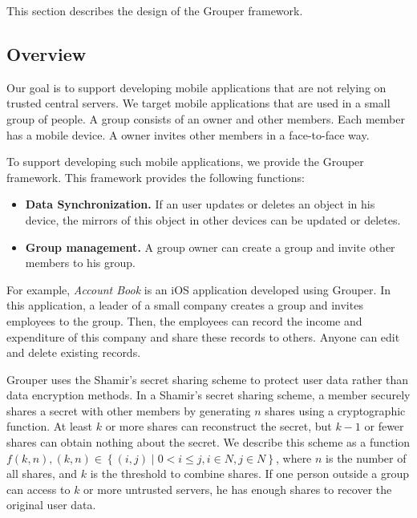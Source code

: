 \documentclass[twocolumn,10pt]{article}
\begin{document}
This section describes the design of the Grouper framework.

\subsection{Overview}

Our goal is to support developing mobile applications that are not relying on trusted central servers.
We target mobile applications that are used in a small group of people.
A group consists of an owner and other members.
Each member has a mobile device.
A owner invites other members in a face-to-face way.

To support developing such mobile applications, we provide the Grouper framework.
This framework provides the following functions:

\begin{itemize}
	\setlength{\itemsep}{1pt}
	\setlength{\parskip}{0pt}
	\setlength{\parsep}{0pt}
	\item \textbf{Data Synchronization.} 
	If an user updates or deletes an object in his device, the mirrors of this object in other devices can be updated or deletes.
	\item \textbf{Group management.} 
	A group owner can create a group and invite other members to his group.
\end{itemize}

For example, \emph{Account Book} is an iOS application developed using Grouper. 
In this application, a leader of a small company creates a group and invites employees to the group. 
Then, the employees can record the income and expenditure of this company and share these records to others.
Anyone can edit and delete existing records.

Grouper uses the Shamir's secret sharing scheme to protect user data rather than data encryption methods.
In a Shamir's secret sharing scheme, a member securely shares a secret with other members by generating $n$ shares using a cryptographic function\cite{smith2013layered}. 
At least $k$ or more shares can reconstruct the secret, but $k-1$ or fewer shares can obtain nothing about the secret\cite{pang2005new}. 
We describe this scheme as a function ${f(k, n), (k, n) \in \left \{(i, j) \mid 0 < i \leq j, i \in N, j \in N \right \}}$, where $n$ is the number of all shares, and $k$ is the threshold to combine shares. 
If one person outside a group can access to $k$ or more untrusted servers, he has enough shares to recover the original user data.
\end{document}
